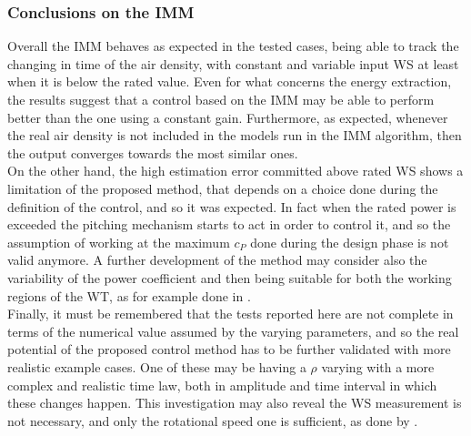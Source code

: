 \subsubsection{Conclusions on the IMM}
Overall the IMM behaves as expected in the tested cases, being able to track the changing in time of the air density, with constant and variable input WS at least when it is below the rated value. Even for what concerns the energy extraction, the results suggest that a control based on the IMM may be able to perform better than the one using a constant gain. Furthermore, as expected, whenever the real air density is not included in the models run in the IMM algorithm, then the output converges towards the most similar ones.\\
On the other hand, the high estimation error committed above rated WS shows a limitation of the proposed method, that depends on a choice done during the definition of the control, and so it was expected. In fact when the rated power is exceeded the pitching mechanism starts to act in order to control it, and so the assumption of working at the maximum $c_P$ done during the design phase is not valid anymore. A further development of the method may consider also the variability of the power coefficient and then being suitable for both the working regions of the WT, as for example done in \cite{kalman_based_IMM}.\\
Finally, it must be remembered that the tests reported here are not complete in terms of the numerical value assumed by the varying parameters, and so the real potential of the proposed control method has to be further validated with more realistic example cases. One of these may be having a $\rho$ varying with a more complex and realistic time law, both in amplitude and time interval in which these changes happen. This investigation may also reveal the WS measurement is not necessary, and only the rotational speed one is sufficient, as done by \cite{kalman_based_IMM}.

\newpage